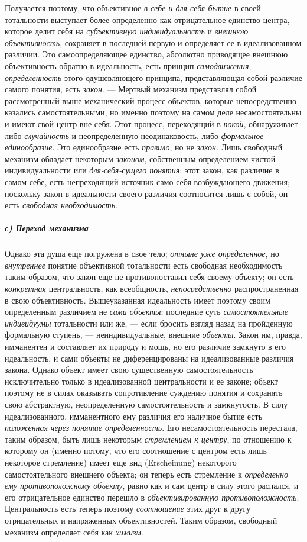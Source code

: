 \documentclass[twoside]{article}
\begin{document}
{{{Получается поэтому, что объективное
{\em в-себе-и-для-себя-бытие}
в своей тотальности выступает более определенно как
отрицательное единство центра, которое делит себя на
{\em субъективную индивидуальность}
и {\em внешнюю
объективность}, сохраняет в последней первую и определяет ее
в идеализованном различии. Это самоопределяющее единство, абсолютно
приводящее внешнюю объективность обратно в идеальность, есть принцип
{\em самодвижения};
{\em определенность} этого
одушевляющего принципа, представляющая собой различие самого понятия, есть
{\em закон}. — Мертвый
механизм представлял собой рассмотренный выше механический
процесс объектов, которые непосредственно казались самостоятельными, но
именно поэтому на самом деле несамостоятельны и имеют свой центр вне себя.
Этот процесс, переходящий в
{\em покой}, обнаруживает
либо {\em случайность} и
неопределенную неодинаковость, либо
{\em формальное единообразие}.
Это единообразие есть
{\em правило}, но не
{\em закон}. Лишь
свободный механизм обладает некоторым
{\em законом},
собственным определением чистой индивидуальности или
{\em для-себя-сущего понятия};
этот закон, как различие в самом себе, есть непреходящий
источник само себя возбуждающего движения; поскольку закон в идеальности
своего различия соотносится лишь с собой, он есть
{\em свободная необходимость}.

\subparagraph[с) Переход механизма]{с) Переход механизма}
Однако эта душа еще погружена в свое тело;
{\em отныне уже определенное},
но {\em внутреннее}
понятие объективной тотальности есть свободная необходимость
таким образом, что закон еще не противопоставил себя своему объекту; он
есть {\em конкретная}
центральность, как всеобщность,
{\em непосредственно}
распространенная в свою объективность. Вышеуказанная
идеальность имеет поэтому своим определенным различием не
{\em сами объекты};
последние суть
{\em самостоятельные индивидуумы}
тотальности или же, — если бросить взгляд
назад на пройденную формальную ступень, — неиндивидуальные,
внешние {\em объекты}.
Закон им, правда, имманентен и составляет их природу и мощь,
но его различие замкнуто в его идеальность, и сами объекты не
диференцированы на идеализованные различия закона. Однако объект имеет свою
существенную самостоятельность исключительно только в идеализованной
центральности и ее законе; объект поэтому не в силах оказывать
сопротивление суждению понятия и сохранять свою абстрактную, неопределенную
самостоятельность и замкнутость. В силу идеализованного, имманентного ему
различия его наличное бытие есть
{\em положенная}
{\em через понятие определенность}.
Его несамостоятельность перестала, таким образом, быть лишь
некоторым {\em стремлением к центру},
по отношению к которому он (именно потому, что его
соотношение с центром есть лишь некоторое стремление) имеет еще вид
(Erscheinung) некоторого самостоятельного внешнего объекта;
он теперь есть стремление к
{\em определенно ему противоположному
объекту}, равно как и сам центр в силу этого распался, и его
отрицательное единство перешло в
{\em объективированную
противоположность}. Центральность есть теперь
поэтому
{\em соотношение} этих
друг к другу отрицательных и напряженных объективностей. Таким образом,
свободный механизм определяет себя как
{\em химизм}.

}}}
\end{document}
